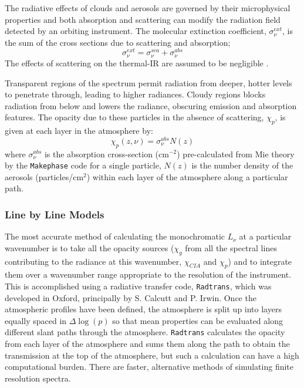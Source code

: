 \documentclass[final,5p,times,twocolumn,authoryear]{elsarticle}
\begin{document}
The radiative effects of clouds and aerosols are governed by their microphysical properties and both absorption and scattering can modify the radiation field detected by an orbiting instrument.  The molecular extinction coefficient, $\sigma_{\nu}^{ext}$, is the sum of the cross sections due to scattering and absorption;
\begin{equation}
\sigma_{\nu}^{ext}=\sigma_{\nu}^{sca}+\sigma_{\nu}^{abs}
\end{equation}
The effects of scattering on the thermal-IR are assumed to be negligible \citep{98nixon, 04irwin}.

Transparent regions of the spectrum permit radiation from deeper, hotter levels to penetrate through, leading to higher radiances.  Cloudy regions blocks radiation from below and lowers the radiance, obscuring emission and absorption features.   The opacity due to these particles in the absence of scattering, $\chi_p$, is given at each layer in the atmosphere by:
\begin{equation}
\chi_p(z,\nu)=\sigma_{\nu}^{abs}N(z)
\end{equation}
where $\sigma_{\nu}^{abs}$ is the absorption cross-section (cm$^{-2}$) pre-calculated from Mie theory by the \verb#Makephase# code for a single particle, $N(z)$ is the number density of the aerosols (particles/cm$^{2}$) within each layer of the atmosphere along a particular path.  

\subsubsection{Line by Line Models}

The most accurate method of calculating the monochromatic $L_\nu$ at a particular wavenumber is to take all the opacity sources ($\chi_g$ from all the spectral lines contributing to the radiance at this wavenumber, $\chi_{CIA}$ and $\chi_p$) and to integrate them over a wavenumber range appropriate to the resolution of the instrument.  This is accomplished using a radiative transfer code, \verb#Radtrans#, which was developed in Oxford, principally by S. Calcutt and P. Irwin. Once the atmospheric profiles have been defined, the atmosphere is split up into layers equally spaced in $\Delta \log(p)$ so that mean properties can be evaluated along different slant paths through the atmosphere.  \verb#Radtrans# calculates the opacity from each layer of the atmosphere and sums them along the path to obtain the transmission at the top of the atmosphere, but such a calculation can have a high computational burden.  There are faster, alternative methods of simulating finite resolution spectra.
\end{document}
